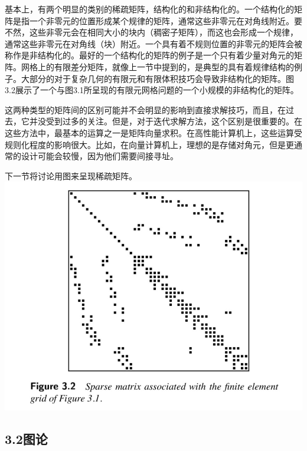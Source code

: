 \documentclass{article}
\begin{document}
基本上，有两个明显的类别的稀疏矩阵，结构化的和非结构化的。一个结构化的矩阵是指一个非零元的位置形成某个规律的矩阵，通常这些非零元在对角线附近。要不然，这些非零元会在相同大小的块内（稠密子矩阵），而这也会形成一个规律，通常这些非零元在对角线（块）附近。一个具有着不规则位置的非零元的矩阵会被称作是非结构化的。最好的一个结构化的矩阵的例子是一个只有着少量对角元的矩阵。网格上的有限差分矩阵，就像上一节中提到的，是典型的具有着规律结构的例子。大部分的对于复杂几何的有限元和有限体积技巧会导致非结构化的矩阵。图3.2展示了一个与图3.1所呈现的有限元网格问题的一个小规模的非结构化的矩阵。
\newline

这两种类型的矩阵间的区别可能并不会明显的影响到直接求解技巧，而且，在过去，它并没受到过多的关注。但是，对于迭代求解方法，这个区别是很重要的。在这些方法中，最基本的运算之一是矩阵向量求积。在高性能计算机上，这些运算受规则化程度的影响很大。比如，在向量计算机上，理想的是存储对角元，但是更通常的设计可能会较慢，因为他们需要间接寻址。
\newline

下一节将讨论用图来呈现稀疏矩阵。
\newline\newline\newline\newline\newline\newline
\includegraphics[scale=0.4]{3_2.png}
\newline\newline
\subsection*{3.2图论}
\end{document}
